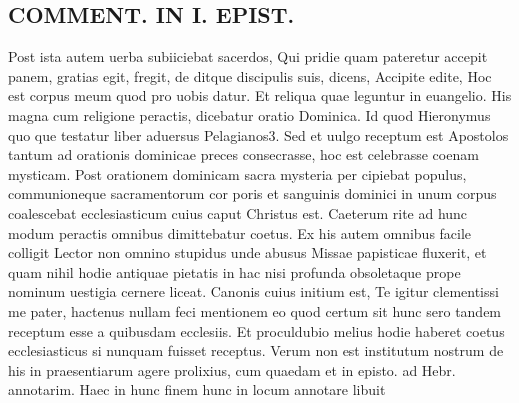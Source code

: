 \documentclass{article}
\begin{document}
\begin{pages}
\section*{COMMENT. IN I. EPIST. }\pstart Post ista autem uerba subiiciebat sacerdos, Qui pridie quam pateretur accepit panem, gratias egit, fregit, de ditque discipulis suis, dicens, Accipite edite, Hoc est corpus meum quod pro uobis datur. Et reliqua quae leguntur in euangelio. His magna cum religione peractis, dicebatur oratio Dominica. Id quod Hieronymus quo que testatur liber  aduersus Pelagianos3. Sed et uulgo receptum est Apostolos tantum ad orationis dominicae preces consecrasse, hoc est celebrasse coenam mysticam. Post orationem dominicam sacra mysteria per cipiebat populus, communioneque sacramentorum cor poris et sanguinis dominici in unum corpus coalescebat ecclesiasticum cuius caput Christus est. Caeterum rite ad hunc modum peractis omnibus dimittebatur coetus. Ex his autem omnibus facile colligit Lector non omnino stupidus unde abusus Missae papisticae fluxerit, et quam nihil hodie antiquae pietatis in hac nisi profunda obsoletaque prope nominum uestigia cernere liceat. Canonis cuius initium est, Te igitur clementissi me pater, hactenus nullam feci mentionem eo quod certum sit hunc sero tandem receptum esse a quibusdam ecclesiis. Et proculdubio melius hodie haberet coetus ecclesiasticus si nunquam fuisset receptus. Verum non est institutum nostrum de his in praesentiarum agere prolixius, cum quaedam et in episto. ad Hebr. annotarim. Haec in hunc finem hunc in locum annotare libuit  \pend

\end{pages}
\end{document}

